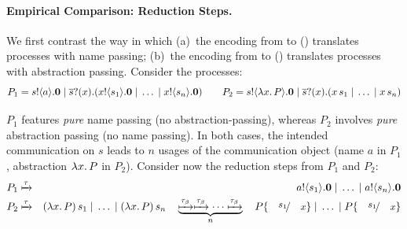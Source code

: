 \documentclass[runningheads]{llncs}
\begin{document}
{{\paragraph{Empirical Comparison: Reduction Steps.}
We first contrast the way in which 
(a)~the encoding from \HOp to \HO () translates processes with name passing;
(b)~the encoding from \HOp to \sessp () translates processes with abstraction passing.
Consider the \HOp processes:
$$
P_1  =  s ! \langle a \rangle . \mathbf{0} \;|\; \overline{s} ? (x) . (x ! \langle s_1 \rangle . \mathbf{0} \;|\; \dots \;|\; x ! \langle s_n \rangle . \mathbf{0}) \qquad
P_2  =  s ! \langle \lambda x.\,P \rangle . \mathbf{0} \;|\; \overline{s} ? (x) . (x\, {s_1} \;|\; \dots \;|\; x\, {s_n})
$$

 $P_1$ features \emph{pure} name passing (no abstraction-passing), whereas 
$P_2$ involves \emph{pure} abstraction passing (no name passing). In both cases, 
the intended communication on $s$ leads to $n$ usages of the communication object (name $a$ in $P_1$, abstraction $\lambda x.\,P$ in $P_2$).
Consider now the reduction steps from $P_1$ and $P_2$:
\begin{eqnarray*}
P_1 & \hby{\tau} & \bout{a}{s_1} \inact \Par \dots \Par \bout{a}{s_n} \inact \\
P_2 & \hby{\tau}& \appl{(\abs{x}{P})}{s_1} \Par \dots \Par \appl{(\abs{x}{P})}{s_n} \quad 
\underbrace{\hby{\btau}\hby{\btau} \cdots \hby{\btau}}_{n} 
\quad P \subst{s_1}{x} \Par \dots \Par P \subst{s_1}{x} 
\end{eqnarray*}

}}
\end{document}
